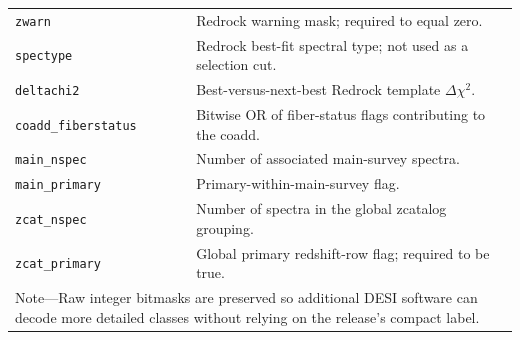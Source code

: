 \documentclass[twocolumn]{aastex701}
\begin{document}
\begin{center}
\begin{tabular}{p{}p{}}
\texttt{zwarn} & Redrock warning mask; required to equal zero. \\
\texttt{spectype} & Redrock best-fit spectral type; not used as a selection cut. \\
\texttt{deltachi2} & Best-versus-next-best Redrock template $\Delta\chi^2$. \\
\texttt{coadd\_fiberstatus} & Bitwise OR of fiber-status flags contributing to the coadd. \\
\texttt{main\_nspec} & Number of associated main-survey spectra. \\
\texttt{main\_primary} & Primary-within-main-survey flag. \\
\texttt{zcat\_nspec} & Number of spectra in the global zcatalog grouping. \\
\texttt{zcat\_primary} & Global primary redshift-row flag; required to be true. \\
\bottomrule
\multicolumn{2}{p{0.93\textwidth}}{\footnotesize Note---Raw integer bitmasks are preserved so
additional DESI software can decode more detailed classes without relying on the release's compact
label.}\\
\end{tabular}
\end{center}
\end{document}
